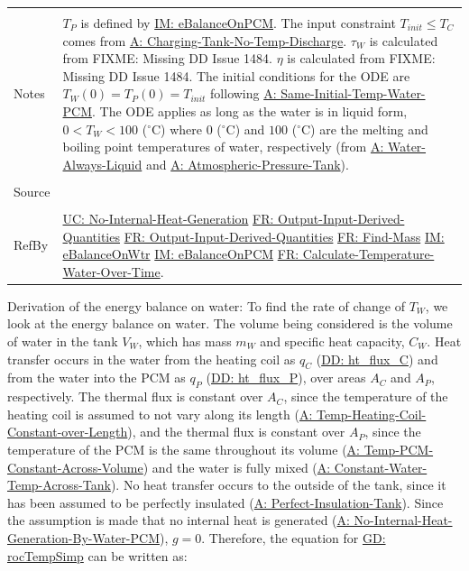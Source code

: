 \documentclass[12pt]{article}
\begin{document}
\begin{minipage}{\textwidth}
\begin{tabular}{p{} p{}}
\\ \midrule \\
Notes & ${T_{P}}$ is defined by \hyperref[IM:eBalanceOnPCM]{IM: eBalanceOnPCM}.
        The input constraint ${T_{init}}\leq{}{T_{C}}$ comes from \hyperref[assumpCTNOD]{A: Charging-Tank-No-Temp-Discharge}.
        ${τ_{W}}$ is calculated from FIXME: Missing DD Issue 1484.
        $η$ is calculated from FIXME: Missing DD Issue 1484.
        The initial conditions for the ODE are ${T_{W}}\left(0\right)={T_{P}}\left(0\right)={T_{init}}$ following \hyperref[assumpSITWP]{A: Same-Initial-Temp-Water-PCM}.
        The ODE applies as long as the water is in liquid form, $0<{T_{W}}<100$ (${}^{\circ}$C) where $0$ (${}^{\circ}$C) and $100$ (${}^{\circ}$C) are the melting and boiling point temperatures of water, respectively (from \hyperref[assumpWAL]{A: Water-Always-Liquid} and \hyperref[assumpAPT]{A: Atmospheric-Pressure-Tank}).
\\ \midrule \\
Source & \cite{koothoor2013}
\\ \midrule \\
RefBy & \hyperref[unlikeChgNIHG]{UC: No-Internal-Heat-Generation} \hyperref[outputInputDerivQuants]{FR: Output-Input-Derived-Quantities} \hyperref[outputInputDerivQuants]{FR: Output-Input-Derived-Quantities} \hyperref[findMass]{FR: Find-Mass} \hyperref[IM:eBalanceOnWtr]{IM: eBalanceOnWtr} \hyperref[IM:eBalanceOnPCM]{IM: eBalanceOnPCM} \hyperref[calcTempWtrOverTime]{FR: Calculate-Temperature-Water-Over-Time}.
\\ \bottomrule \end{tabular}
\end{minipage}
Derivation of the energy balance on water:
To find the rate of change of ${T_{W}}$, we look at the energy balance on water. The volume being considered is the volume of water in the tank ${V_{W}}$, which has mass ${m_{W}}$ and specific heat capacity, ${C_{W}}$. Heat transfer occurs in the water from the heating coil as ${q_{C}}$ (\hyperref[DD:ht.flux.C]{DD: ht\_flux\_C})  and from the water into the PCM as ${q_{P}}$ (\hyperref[DD:ht.flux.P]{DD: ht\_flux\_P}), over areas ${A_{C}}$ and ${A_{P}}$, respectively. The thermal flux is constant over ${A_{C}}$, since the temperature of the heating coil is assumed to not vary along its length (\hyperref[assumpTHCCoL]{A: Temp-Heating-Coil-Constant-over-Length}), and the thermal flux is constant over ${A_{P}}$, since the temperature of the PCM is the same throughout its volume (\hyperref[assumpTPCAV]{A: Temp-PCM-Constant-Across-Volume}) and the water is fully mixed (\hyperref[assumpCWTAT]{A: Constant-Water-Temp-Across-Tank}). No heat transfer occurs to the outside of the tank, since it has been assumed to be perfectly insulated (\hyperref[assumpPIT]{A: Perfect-Insulation-Tank}). Since the assumption is made that no internal heat is generated (\hyperref[assumpNIHGBWP]{A: No-Internal-Heat-Generation-By-Water-PCM}), $g=0$. Therefore, the equation for \hyperref[GD:rocTempSimp]{GD: rocTempSimp} can be written as:
\end{document}
